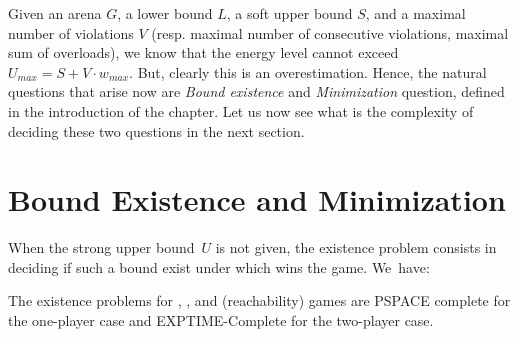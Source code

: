 \vskip 0.5cm
Given an arena $G$, a lower bound $L$, a soft upper bound $S$, and a maximal number of violations $V$ (resp. maximal number of consecutive violations, maximal sum of overloads), we know that the energy level cannot exceed $U_{max} = S + V \cdot w_{max}$. But, clearly this is an overestimation. Hence, the natural questions that arise now are \textit{Bound existence} and \textit{Minimization} question, defined in the introduction of the chapter. Let us now see what is the complexity of deciding these two questions in the next section.

\section{Bound Existence and Minimization}
When the strong upper bound~$U$ is not given, the existence problem
consists in deciding if such a bound exist under which  wins the \APNAenergyall game. We~have:


\begin{theorem}
\label{thm_Apnar_exists_min_exptimec}
The existence problems for \LVenergynb, \LVenergyconsnb, and
\LVenergysum (reachability) games are PSPACE complete for the
one-player case and EXPTIME-Complete for the two-player case.
\end{theorem}


